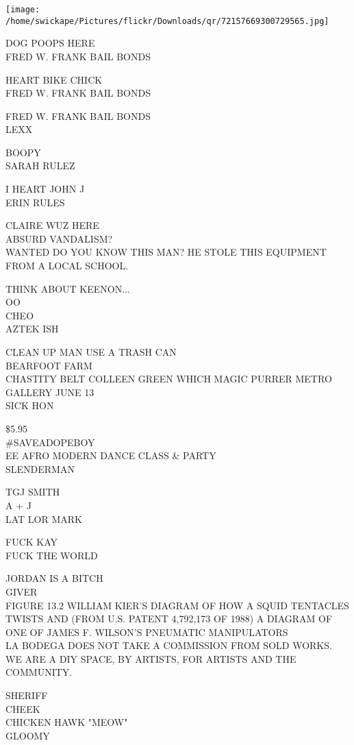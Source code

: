 \documentclass[10pt,letterpaper]{article}
\begin{document}
\texttt{[image: /home/swickape/Pictures/flickr/Downloads/qr/72157669300729565.jpg]}


DOG POOPS HERE\\
FRED W. FRANK BAIL BONDS

HEART BIKE CHICK\\
FRED W. FRANK BAIL BONDS

FRED W. FRANK BAIL BONDS\\
LEXX

BOOPY\\
SARAH RULEZ

I HEART JOHN J\\
ERIN RULES

CLAIRE WUZ HERE\\
ABSURD VANDALISM?\\
WANTED DO YOU KNOW THIS MAN?  HE STOLE THIS EQUIPMENT FROM A LOCAL SCHOOL.

THINK ABOUT KEENON...\\
OO\\
CHEO\\
AZTEK ISH

CLEAN UP MAN USE A TRASH CAN\\
BEARFOOT FARM\\
CHASTITY BELT COLLEEN GREEN WHICH MAGIC PURRER METRO GALLERY JUNE 13\\
SICK HON

\$5.95\\
\#SAVEADOPEBOY\\
EE AFRO MODERN DANCE CLASS \& PARTY\\
SLENDERMAN

TGJ SMITH\\
A + J\\
LAT LOR MARK

FUCK KAY\\
FUCK THE WORLD

JORDAN IS A BITCH\\
GIVER\\
FIGURE 13.2 WILLIAM KIER'S DIAGRAM OF HOW A SQUID TENTACLES TWISTS AND (FROM U.S. PATENT 4,792,173 OF 1988) A DIAGRAM OF ONE OF JAMES F. WILSON'S PNEUMATIC MANIPULATORS\\
LA BODEGA DOES NOT TAKE A COMMISSION FROM SOLD WORKS.  WE ARE A DIY SPACE, BY ARTISTS, FOR ARTISTS AND THE COMMUNITY.

SHERIFF\\
CHEEK\\
CHICKEN HAWK "MEOW"\\
GLOOMY
\end{document}
